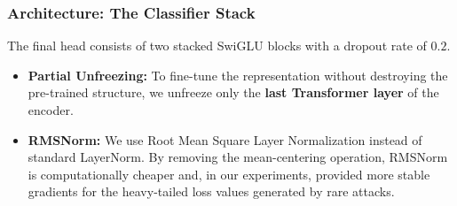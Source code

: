 \documentclass[
  10pt,
  twocolumn,
  a4paper,
  parskip=half
]{scrartcl}
\begin{document}
    \subsubsection{Architecture: The Classifier Stack}
    The final head consists of two stacked SwiGLU blocks with a dropout rate of $0.2$.
    \begin{itemize}
        \item \textbf{Partial Unfreezing:} To fine-tune the representation without destroying the pre-trained structure, we unfreeze only the \textbf{last Transformer layer} of the encoder.
        \item \textbf{RMSNorm:} We use Root Mean Square Layer Normalization instead of standard LayerNorm. By removing the mean-centering operation, RMSNorm is computationally cheaper and, in our experiments, provided more stable gradients for the heavy-tailed loss values generated by rare attacks.
    \end{itemize}
\end{document}

